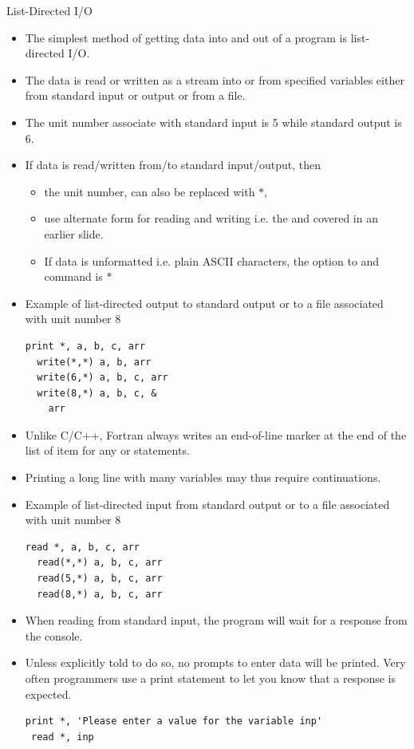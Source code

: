\documentclass[10pt,t]{beamer}
\begin{document}
\begin{frame}{List-Directed I/O}
  \begin{itemize}
    \item The simplest method of getting data into and out of a program is list-directed I/O.
    \item The data is read or written as a stream into or from specified variables either from standard input or output or from a file.
    \item The unit number associate with standard input is 5 while standard output is 6.
    \item If data is read/written from/to standard input/output, then
      \begin{itemize}
        \item the unit number,  can also be replaced with $\ast$,
        \item use alternate form for reading and writing i.e. the  and  covered in an earlier slide.
        \item If data is unformatted i.e. plain ASCII characters, the option to  and  command is $\ast$
      \end{itemize}
    \item Example of list-directed output to standard output or to a file associated with unit number 8
      \begin{lstlisting}[language={[90]Fortran}]
  print *, a, b, c, arr
  write(*,*) a, b, arr
  write(6,*) a, b, c, arr
  write(8,*) a, b, c, &
    arr
      \end{lstlisting}
    \item Unlike C/C++, Fortran always writes an end-of-line marker at the end of the list of item for any  or  statements.
    \item Printing a long line with many variables may thus require continuations.
    \item Example of list-directed input from standard output or to a file associated with unit number 8
      \begin{lstlisting}[language={[90]Fortran}]
  read *, a, b, c, arr
  read(*,*) a, b, c, arr
  read(5,*) a, b, c, arr
  read(8,*) a, b, c, arr
      \end{lstlisting}
    \item When reading from standard input, the program will wait for a response from the console.
    \item Unless explicitly told to do so, no prompts to enter data will be printed. Very often programmers use a print statement to let you know that a response is expected.
      \begin{lstlisting}[language={[90]Fortran}]
 print *, 'Please enter a value for the variable inp'
 read *, inp
      \end{lstlisting}
  \end{itemize}
\end{frame}
\end{document}
